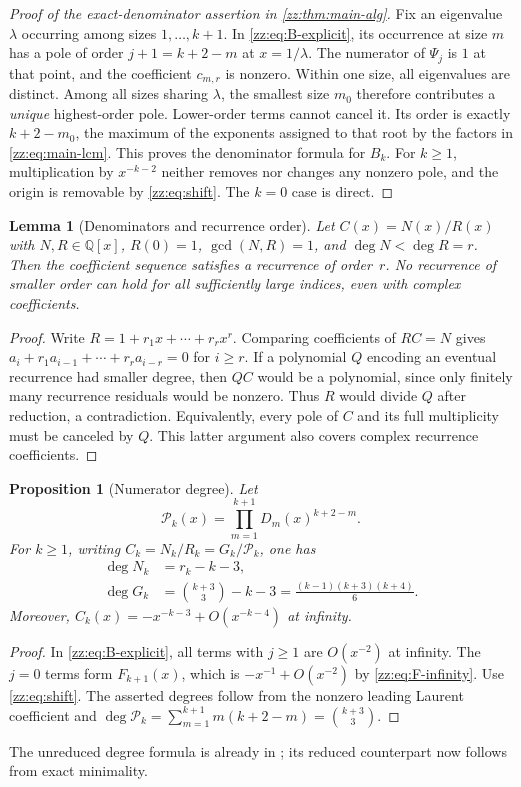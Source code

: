 \documentclass[11pt,a4paper]{article}
\newtheorem{proposition}[theorem]{Proposition}
\newtheorem{lemma}[theorem]{Lemma}
\theoremstyle{definition}
\newcommand{\Q}{\mathbb{Q}}
\begin{document}
\begin{proof}[Proof of the exact-denominator assertion in \cref{zz:thm:main-alg}]
Fix an eigenvalue $\lambda$ occurring among sizes $1,\ldots,k+1$.
In \eqref{zz:eq:B-explicit}, its occurrence at size $m$ has a pole of order
$j+1=k+2-m$ at $x=1/\lambda$.
The numerator of $\Psi_j$ is $1$ at that point, and the coefficient $c_{m,r}$
is nonzero.  Within one size, all eigenvalues are distinct.
Among all sizes sharing $\lambda$, the smallest size $m_0$ therefore
contributes a \emph{unique} highest-order pole.  Lower-order terms cannot
cancel it.  Its order is exactly $k+2-m_0$, the maximum of the exponents
assigned to that root by the factors in \eqref{zz:eq:main-lcm}.
This proves the denominator formula for $B_k$.  For $k\ge1$, multiplication
by $x^{-k-2}$ neither removes nor changes any nonzero pole, and the origin is
removable by \eqref{zz:eq:shift}.  The $k=0$ case is direct.
\end{proof}

\begin{lemma}[Denominators and recurrence order]
\label{zz:lem:rec-order}
Let $C(x)=N(x)/R(x)$ with $N,R\in\Q[x]$, $R(0)=1$,
$\gcd(N,R)=1$, and $\deg N<\deg R=r$.
Then the coefficient sequence satisfies a recurrence of order~$r$.
No recurrence of smaller order can hold for all sufficiently large indices,
even with complex coefficients.
\end{lemma}
\begin{proof}
Write $R=1+r_1x+\cdots+r_rx^r$.  Comparing coefficients of $RC=N$ gives
$a_i+r_1a_{i-1}+\cdots+r_ra_{i-r}=0$ for $i\ge r$.
If a polynomial $Q$ encoding an eventual recurrence had smaller degree,
then $QC$ would be a polynomial, since only finitely many recurrence residuals
would be nonzero.  Thus $R$ would divide $Q$ after reduction, a contradiction.
Equivalently, every pole of $C$ and its full multiplicity must be canceled by
$Q$.  This latter argument also covers complex recurrence coefficients.
\end{proof}

\begin{proposition}[Numerator degree]
\label{zz:prop:numdegree}
Let
\[
 \mathcal P_k(x)=\prod_{m=1}^{k+1}D_m(x)^{k+2-m}.
\]
For $k\ge1$, writing $C_k=N_k/R_k=G_k/\mathcal P_k$, one has
\begin{align}
 \deg N_k&=r_k-k-3,\label{zz:eq:reduced-num}\\
 \deg G_k&=\binom{k+3}{3}-k-3
          =\frac{(k-1)(k+3)(k+4)}6.\label{zz:eq:old-num}
\end{align}
Moreover, $C_k(x)=-x^{-k-3}+O(x^{-k-4})$ at infinity.
\end{proposition}
\begin{proof}
In \eqref{zz:eq:B-explicit}, all terms with $j\ge1$ are $O(x^{-2})$ at infinity.
The $j=0$ terms form $F_{k+1}(x)$, which is $-x^{-1}+O(x^{-2})$ by
\eqref{zz:eq:F-infinity}.  Use \eqref{zz:eq:shift}.  The asserted degrees follow
from the nonzero leading Laurent coefficient and
$\deg\mathcal P_k=\sum_{m=1}^{k+1}m(k+2-m)=\binom{k+3}{3}$.
\end{proof}
The unreduced degree formula is already in \cite{xz}; its reduced counterpart
now follows from exact minimality.
\end{document}
